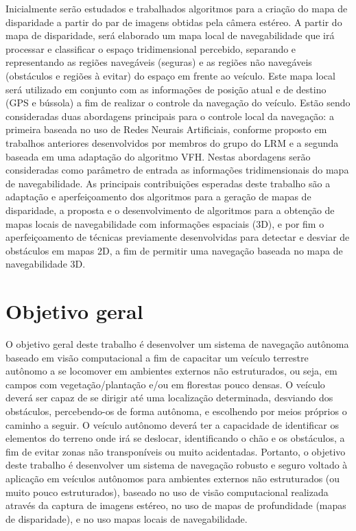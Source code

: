 \documentclass{article}
\begin{document}
Inicialmente serão estudados e trabalhados algoritmos para a criação do mapa de
disparidade a partir do par de imagens obtidas pela câmera estéreo.
A partir do mapa de disparidade, será elaborado um mapa local de navegabilidade
que irá processar e classificar o espaço tridimensional percebido, separando e
representando as regiões navegáveis (seguras) e as regiões não navegáveis
(obstáculos e regiões à evitar) do espaço em frente ao veículo. Este mapa local
será utilizado em conjunto com as informações de posição atual e de destino (GPS
e bússola) a fim de realizar o controle da navegação do veículo. Estão sendo
consideradas duas abordagens principais para o controle local da navegação: a
primeira baseada no uso de Redes Neurais Artificiais, conforme proposto em
trabalhos anteriores desenvolvidos por membros do grupo do LRM e a segunda
baseada em uma adaptação do algoritmo VFH. Nestas abordagens serão consideradas
como parâmetro de entrada as informações tridimensionais do mapa de
navegabilidade. As principais contribuições esperadas deste trabalho são a
adaptação e aperfeiçoamento dos algoritmos para a geração de mapas de disparidade, a
proposta e o desenvolvimento de algoritmos para a obtenção de mapas locais de
navegabilidade com informações espaciais (3D), e por fim o aperfeiçoamento de
técnicas previamente desenvolvidas para detectar e desviar de obstáculos em
mapas 2D, a fim de permitir uma navegação baseada no mapa de navegabilidade 3D.

\section{Objetivo geral}

O objetivo geral deste trabalho é desenvolver um sistema de navegação autônoma baseado
em visão computacional a fim de capacitar um veículo terrestre autônomo a se locomover em
ambientes externos não estruturados, ou seja, em campos com vegetação/plantação e/ou em
florestas pouco densas. O veículo deverá ser capaz de se dirigir até uma localização determinada,
desviando dos obstáculos, percebendo-os de forma autônoma, e escolhendo por meios próprios o
caminho a seguir. O veículo autônomo deverá ter a capacidade de identificar os elementos do terreno
onde irá se deslocar, identificando o chão e os obstáculos, a fim de evitar zonas não transponíveis ou
muito acidentadas. Portanto, o objetivo deste trabalho é desenvolver um sistema de navegação
robusto e seguro voltado à aplicação em veículos autônomos para ambientes externos não
estruturados (ou muito pouco estruturados), baseado no uso de visão computacional realizada
através da captura de imagens estéreo, no uso de mapas de profundidade (mapas de disparidade), e
no uso mapas locais de navegabilidade.
\end{document}
